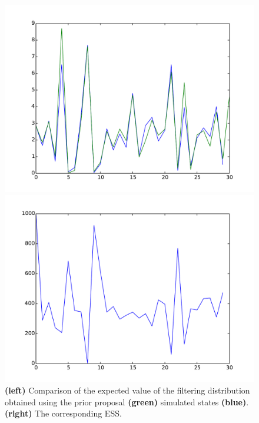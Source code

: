 \documentclass{article}
\begin{document}
\begin{figure}[htb]
	\centering
	\begin{minipage}{.45\textwidth}
		\centering
		\includegraphics[width=0.97\linewidth]{bootstrap-filter/diagno_prior.pdf}
	\end{minipage}
	\begin{minipage}{.45\textwidth}
		\centering
		\includegraphics[width=0.97\linewidth]{bootstrap-filter/ESS_prior.pdf}
	\end{minipage}
	\caption{\textbf{(left)} Comparison of the expected value of the filtering distribution obtained using the prior proposal \textbf{(green)} simulated states \textbf{(blue)}. \textbf{(right)} The corresponding ESS. }
	\label{fig:prior}
\end{figure}
\end{document}
